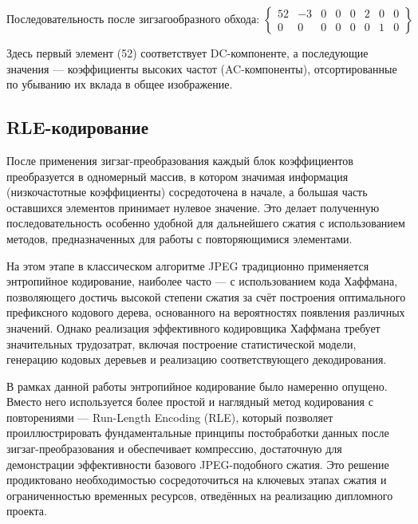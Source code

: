 \begin{equation}
    \label{eq:zigzag_example}
    \text{Последовательность после зигзагообразного обхода: } 
    \left\{
    \begin{array}{cccccccc}
    52 & -3 & 0 & 0 & 0 & 2 & 0 & 0 \\
    0 & 0 & 0 & 0 & 0 & 0 & 1 & 0
    \end{array}
    \right\}
    \end{equation}

Здесь первый элемент (52) соответствует DC-компоненте, а последующие значения — коэффициенты высоких частот (AC-компоненты), 
отсортированные по убыванию их вклада в общее изображение.


\subsection{RLE-кодирование}


После применения зигзаг-преобразования каждый блок коэффициентов преобразуется в одномерный массив, 
в котором значимая информация (низкочастотные коэффициенты) сосредоточена в начале, 
а большая часть оставшихся элементов принимает нулевое значение. 
Это делает полученную последовательность особенно удобной для дальнейшего сжатия с использованием методов, 
предназначенных для работы с повторяющимися элементами.

На этом этапе в классическом алгоритме JPEG традиционно применяется энтропийное кодирование, 
наиболее часто — с использованием кода Хаффмана, 
позволяющего достичь высокой степени сжатия за счёт построения оптимального префиксного кодового дерева, 
основанного на вероятностях появления различных значений. 
Однако реализация эффективного кодировщика Хаффмана требует значительных трудозатрат, 
включая построение статистической модели, генерацию кодовых деревьев и реализацию соответствующего декодирования.

В рамках данной работы энтропийное кодирование было намеренно опущено. 
Вместо него используется более простой и наглядный метод кодирования с повторениями — Run-Length Encoding (RLE), 
который позволяет проиллюстрировать фундаментальные принципы постобработки данных после зигзаг-преобразования и обеспечивает компрессию, 
достаточную для демонстрации эффективности базового JPEG-подобного сжатия. 
Это решение продиктовано необходимостью сосредоточиться на ключевых этапах сжатия и ограниченностью временных ресурсов, 
отведённых на реализацию дипломного проекта.

